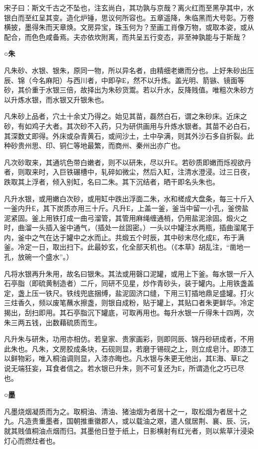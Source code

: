 \documentclass[]{article}
\begin{document}
宋子曰：斯文千古之不坠也，注玄尚白，其功孰与京哉？离火红而至黑孕其中，水银白而至红呈其变。造化炉锤，思议何所容也。五章遥降，朱临黑而大号彰。万卷横披，墨得朱而天章焕。文房异宝，珠玉何为？至画工肖像万物，或取本姿，或从配合，而色色咸备焉。夫亦依坎附离，而共呈五行变态，非至神孰能与于斯哉？

\textbf{○朱}

凡朱砂、水银、银朱，原同一物，所以异名者，由精细老嫩而分也。上好朱砂出压辰、锦（今名麻阳）与西川者，中即孕Е，然不以升炼。盖光明、箭镞、镜面等砂，其价重于水银三倍，故择出为朱砂货鬻。若以升水，反降贱值。唯粗次朱砂方以升炼水银，而水银又升银朱也。

凡朱砂上品者，穴土十余丈乃得之。始见其苗，磊然白石，谓之朱砂床。近床之砂，有如鸡子大者。其次砂不入药，只为研供画用与升炼水银者。其苗不必白石，其深数丈即得。外床或杂青黄石，或间沙土，土中孕满，则其外沙石多自折裂。此种砂贵州思、印、铜仁等地最繁，而商州、秦州出亦广也。

凡次砂取来，其通坑色带白嫩者，则不以研朱，尽以升Е。若砂质即嫩而烁视欲丹者，则取来时，入巨铁碾槽中，轧碎如微尘，然后入缸，注清水澄浸。过三日夜，跌取其上浮者，倾入别缸，名曰二朱。其下沉结者，晒干即名头朱也。

凡升水银，或用嫩白次砂，或用缸中跌出浮面二朱，水和槎成大盘条，每三十斤入一釜内升Е，其下炭质亦用三十斤。凡升Е，上盖一釜，釜当中留一小孔，釜傍盐泥紧固。釜上用铁打成一曲弓溜管，其管用麻绳缠通梢，仍用盐泥涂固。煅火之时，曲溜一头插入釜中通气，（插处一丝固密。）一头以中罐注水两瓶，插曲溜尾于内，釜中之气在达于罐中之水而止。共煅五个时辰，其中砂末尽化成Е，布于满釜。冷定一日，取出扫下。此最妙玄，化全部天机也。（《本草》胡乱注，``凿地一孔，放碗一个盛水''。）

凡将水银再升朱用，故名曰银朱。其法或用磬口泥罐，或用上下釜。每水银一斤入石亭脂（即硫黄制造者）二斤，同研不见星，炒作青砂头，装于罐内。上用铁盏盖定，盏上压一铁尺。铁线兜底捆缚，盐泥固济口缝，下用三钉插地鼎足盛罐。打火三炷香久，频以废笔蘸水擦盏，则银自成粉，贴于罐上，其贴口者朱更鲜华。冷定揭出，刮扫即用。其石亭脂沉下罐底，可取再用也。每升水银一斤得朱十四两，次朱三两五钱，出数藉硫质而生。

凡升朱与研朱，功用亦相仿。若皇家、贵家画彩，则即同辰、锦丹砂研成者，不用此朱也。凡朱，文房胶成条块，石砚则显，若磨于锡砚之上，则立成皂汁。即漆工以鲜物彩，唯入桐油调则显，入漆亦晦也。凡水银与朱更无他出，其Е海、草Е之说无端狂妄，耳食者信之。若水银已升朱，则不可复还为Е，所谓造化之巧已尽也。

\textbf{○墨}

凡墨烧烟凝质而为之。取桐油、清油、猪油烟为者居十之一，取松烟为者居十之九。凡造贵重墨者，国朝推重徽郡人，或以载油之艰，遣人僦居荆、襄、辰、沅，就其贱值桐油点烟而归。其墨他日登于纸上，日影横射有红光者，则以紫草汁浸染灯心而燃炷者也。
\end{document}
